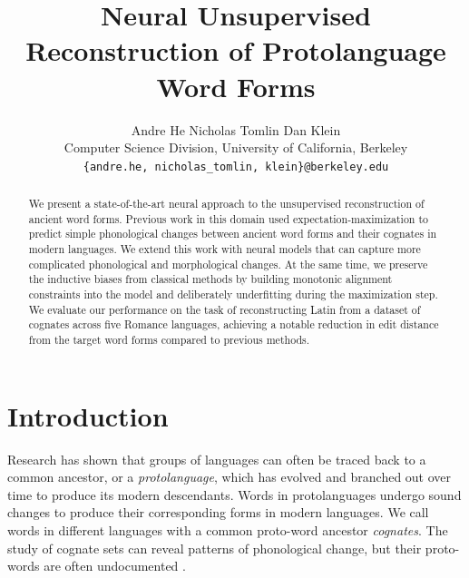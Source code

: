 \documentclass[11pt]{article}
\title{Neural Unsupervised Reconstruction of Protolanguage Word Forms}
\author{Andre He \qquad Nicholas Tomlin \qquad Dan Klein \\
  Computer Science Division, University of California, Berkeley \\
  \texttt{\{andre.he, nicholas\_tomlin, klein\}@berkeley.edu}}
\begin{document}
\maketitle
\begin{abstract}
We present a state-of-the-art neural approach to the unsupervised reconstruction of ancient word forms.
Previous work in this domain used expectation-maximization to predict simple phonological changes between ancient word forms and their cognates in modern languages. 
We extend this work with neural models that can capture more complicated phonological and morphological changes.
At the same time, we preserve the inductive biases from classical methods by building monotonic alignment constraints into the model and deliberately underfitting during the maximization step.
We evaluate our performance on the task of reconstructing Latin from a dataset of cognates across five Romance languages, achieving a notable reduction in edit distance from the target word forms compared to previous methods.


\end{abstract}
\section{Introduction}

Research has shown that groups of languages can often be traced back to a common ancestor, or a \textit{protolanguage}, which has evolved and branched out over time to produce its modern descendants. Words in protolanguages undergo sound changes to produce their corresponding forms in modern languages. We call words in different languages with a common proto-word ancestor \textit{cognates}. The study of cognate sets can reveal patterns of phonological change, but their proto-words are often undocumented \citep{campbell2013historical, Hock+2021}.
\end{document}
